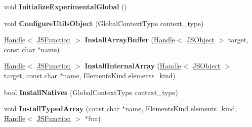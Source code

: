 \begin{DoxyCompactItemize}
\item 
void {\bfseries Initialize\+Experimental\+Global} ()\hypertarget{classv8_1_1internal_1_1_b_a_s_e___e_m_b_e_d_d_e_d_a51bdc3506519b4c1db0d2bde86841a4b}{}\label{classv8_1_1internal_1_1_b_a_s_e___e_m_b_e_d_d_e_d_a51bdc3506519b4c1db0d2bde86841a4b}

\item 
void {\bfseries Configure\+Utils\+Object} (Global\+Context\+Type context\+\_\+type)\hypertarget{classv8_1_1internal_1_1_b_a_s_e___e_m_b_e_d_d_e_d_a59e47a10806b45d06f3ab73ad91dc38b}{}\label{classv8_1_1internal_1_1_b_a_s_e___e_m_b_e_d_d_e_d_a59e47a10806b45d06f3ab73ad91dc38b}

\item 
\hyperlink{classv8_1_1internal_1_1_handle}{Handle}$<$ \hyperlink{classv8_1_1internal_1_1_j_s_function}{J\+S\+Function} $>$ {\bfseries Install\+Array\+Buffer} (\hyperlink{classv8_1_1internal_1_1_handle}{Handle}$<$ \hyperlink{classv8_1_1internal_1_1_j_s_object}{J\+S\+Object} $>$ target, const char $\ast$name)\hypertarget{classv8_1_1internal_1_1_b_a_s_e___e_m_b_e_d_d_e_d_a006110d4778e260312e9d9843f434d88}{}\label{classv8_1_1internal_1_1_b_a_s_e___e_m_b_e_d_d_e_d_a006110d4778e260312e9d9843f434d88}

\item 
\hyperlink{classv8_1_1internal_1_1_handle}{Handle}$<$ \hyperlink{classv8_1_1internal_1_1_j_s_function}{J\+S\+Function} $>$ {\bfseries Install\+Internal\+Array} (\hyperlink{classv8_1_1internal_1_1_handle}{Handle}$<$ \hyperlink{classv8_1_1internal_1_1_j_s_object}{J\+S\+Object} $>$ target, const char $\ast$name, Elements\+Kind elements\+\_\+kind)\hypertarget{classv8_1_1internal_1_1_b_a_s_e___e_m_b_e_d_d_e_d_ad216db59d0199919d63dd051f58f58d7}{}\label{classv8_1_1internal_1_1_b_a_s_e___e_m_b_e_d_d_e_d_ad216db59d0199919d63dd051f58f58d7}

\item 
bool {\bfseries Install\+Natives} (Global\+Context\+Type context\+\_\+type)\hypertarget{classv8_1_1internal_1_1_b_a_s_e___e_m_b_e_d_d_e_d_a4c0bff5a99baa6037a34b7a26f782540}{}\label{classv8_1_1internal_1_1_b_a_s_e___e_m_b_e_d_d_e_d_a4c0bff5a99baa6037a34b7a26f782540}

\item 
void {\bfseries Install\+Typed\+Array} (const char $\ast$name, Elements\+Kind elements\+\_\+kind, \hyperlink{classv8_1_1internal_1_1_handle}{Handle}$<$ \hyperlink{classv8_1_1internal_1_1_j_s_function}{J\+S\+Function} $>$ $\ast$fun)\hypertarget{classv8_1_1internal_1_1_b_a_s_e___e_m_b_e_d_d_e_d_ae3e5efe08adc6fb786d00bdbf9c138be}{}\label{classv8_1_1internal_1_1_b_a_s_e___e_m_b_e_d_d_e_d_ae3e5efe08adc6fb786d00bdbf9c138be}


\end{DoxyCompactItemize}
